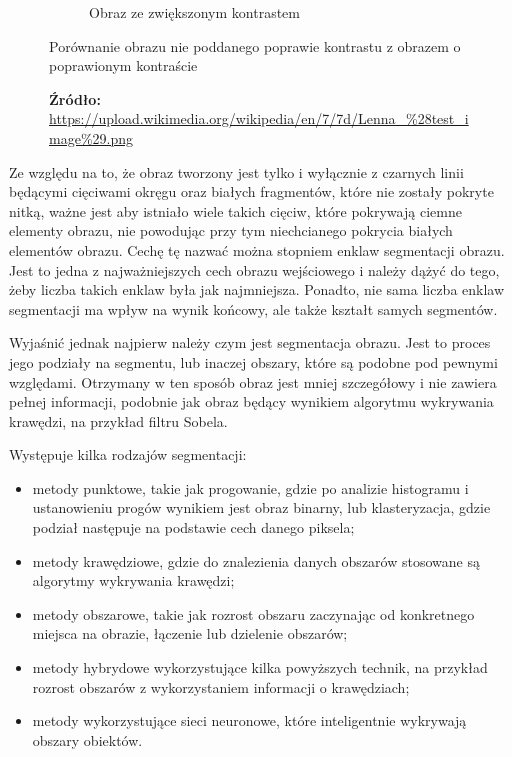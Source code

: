 \begin{figure}[H]
\begin{subfigure}{0.49\textwidth}
                \caption{Obraz ze zwiększonym kontrastem}
                \label{theory-contrast-lenna-b}
            \end{subfigure}
            \caption{Porównanie obrazu nie poddanego poprawie kontrastu z obrazem o poprawionym kontraście}
            \caption*{\footnotesize{\textbf{Źródło:} {\url{https://upload.wikimedia.org/wikipedia/en/7/7d/Lenna_\%28test_image\%29.png}}}}
            \label{theory-contrast-lenna}
        \end{figure}
        
        Ze względu na to, że obraz tworzony jest tylko i wyłącznie z czarnych linii będącymi cięciwami okręgu oraz białych fragmentów, które nie zostały pokryte nitką, ważne jest aby istniało wiele takich cięciw, które pokrywają ciemne elementy obrazu, nie powodując przy tym niechcianego pokrycia białych elementów obrazu. Cechę tę nazwać można stopniem enklaw segmentacji obrazu. Jest to jedna z najważniejszych cech obrazu wejściowego i należy dążyć do tego, żeby liczba takich enklaw była jak najmniejsza. Ponadto, nie sama liczba enklaw segmentacji ma wpływ na wynik końcowy, ale także kształt samych segmentów.
        
        Wyjaśnić jednak najpierw należy czym jest segmentacja obrazu. Jest to proces jego podziały na segmentu, lub inaczej obszary, które są podobne pod pewnymi względami. Otrzymany w ten sposób obraz jest mniej szczegółowy i nie zawiera pełnej informacji, podobnie jak obraz będący wynikiem algorytmu wykrywania krawędzi, na przykład filtru Sobela.
        
        Występuje kilka rodzajów segmentacji:
       \begin{itemize}
            \item metody punktowe, takie jak progowanie, gdzie po analizie histogramu i ustanowieniu progów wynikiem jest obraz binarny, lub klasteryzacja, gdzie podział następuje na podstawie cech danego piksela;
            \item metody krawędziowe, gdzie do znalezienia danych obszarów stosowane są algorytmy wykrywania krawędzi;
            \item metody obszarowe, takie jak rozrost obszaru zaczynając od konkretnego miejsca na obrazie, łączenie lub dzielenie obszarów;
            \item metody hybrydowe wykorzystujące kilka powyższych technik, na przykład rozrost obszarów z wykorzystaniem informacji o krawędziach;
            \item metody wykorzystujące sieci neuronowe, które inteligentnie wykrywają obszary obiektów.
        \end{itemize}

